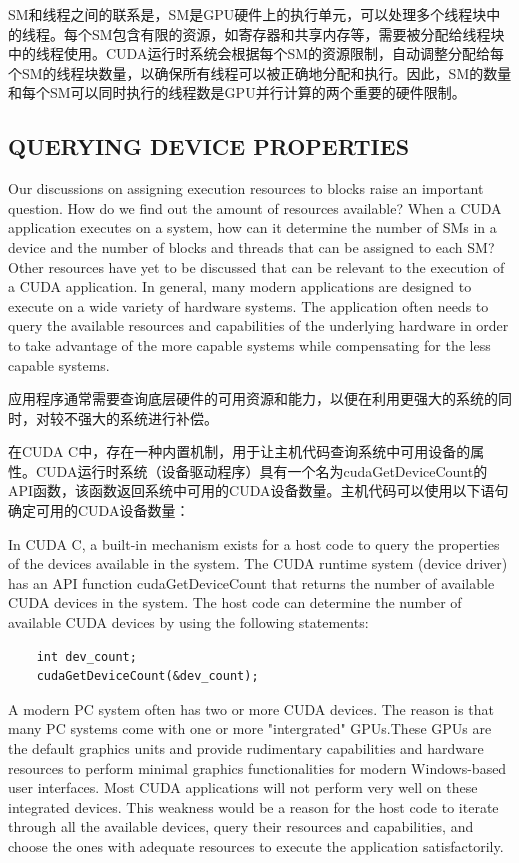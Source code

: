 \documentclass[11pt]{ctexart}
\begin{document}
SM和线程之间的联系是，SM是GPU硬件上的执行单元，可以处理多个线程块中的线程。每个SM包含有限的资源，如寄存器和共享内存等，需要被分配给线程块中的线程使用。CUDA运行时系统会根据每个SM的资源限制，自动调整分配给每个SM的线程块数量，以确保所有线程可以被正确地分配和执行。因此，SM的数量和每个SM可以同时执行的线程数是GPU并行计算的两个重要的硬件限制。

\subsection{QUERYING DEVICE PROPERTIES}

Our discussions on assigning execution resources to blocks raise an important question. How do we find out the amount of resources available? When a CUDA application executes on a system, how can it determine the number of SMs in a device and the number of blocks and threads that can be assigned to each SM? Other resources have yet to be discussed that can be relevant to the execution of a CUDA application. In general, many modern applications are designed to execute on a wide variety of hardware systems. The application often needs to query the available resources and capabilities of the underlying hardware in order to take advantage of the more capable systems while compensating for the less capable systems.

应用程序通常需要查询底层硬件的可用资源和能力，以便在利用更强大的系统的同时，对较不强大的系统进行补偿。

在CUDA C中，存在一种内置机制，用于让主机代码查询系统中可用设备的属性。CUDA运行时系统（设备驱动程序）具有一个名为cudaGetDeviceCount的API函数，该函数返回系统中可用的CUDA设备数量。主机代码可以使用以下语句确定可用的CUDA设备数量：

In CUDA C, a built-in mechanism exists for a host code to query the properties of the devices available in the system. The CUDA runtime system (device driver) has an API function cudaGetDeviceCount that returns the number of available CUDA devices in the system. The host code can determine the number of available CUDA devices by using the following statements:

\begin{lstlisting}
	int dev_count;
	cudaGetDeviceCount(&dev_count);
\end{lstlisting}

A  modern PC system often has two  or more CUDA devices. The reason is that many PC systems come with one or more "intergrated" GPUs.These GPUs are the default graphics units and provide rudimentary capabilities and hardware resources to perform minimal graphics functionalities for modern Windows-based user interfaces. Most CUDA applications will not perform very well on these integrated devices. This weakness would be a reason for the host code to iterate through all the available devices, query their resources and capabilities, and choose the ones with adequate resources to execute the application satisfactorily.
\end{document}
